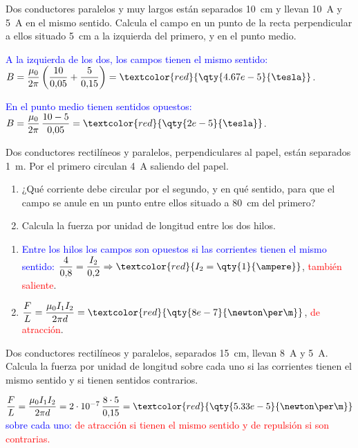 \begin{exercise}
    Dos conductores paralelos y muy largos están separados \qty{10}{\cm} y llevan \qty{10}{\ampere} y \qty{5}{\ampere} en el mismo sentido.
    Calcula el campo en un punto de la recta perpendicular a ellos situado \qty{5}{\cm} a la izquierda del primero, y en el punto medio.
    \begin{solu}
        \textcolor{blue}{A la izquierda de los dos, los campos tienen el mismo sentido:}
        \(B = \dfrac{\mu_0}{2\pi}\left(\dfrac{10}{0{,}05} + \dfrac{5}{0{,}15}\right) = \textcolor{red}{\qty{4.67e-5}{\tesla}}\).

        \textcolor{blue}{En el punto medio tienen sentidos opuestos:} \(B = \dfrac{\mu_0}{2\pi}\,\dfrac{10 - 5}{0{,}05} = \textcolor{red}{\qty{2e-5}{\tesla}}\).
    \end{solu}
\end{exercise}

\begin{exercise}
    Dos conductores rectilíneos y paralelos, perpendiculares al papel, están separados \qty{1}{\m}. Por el primero circulan \qty{4}{\ampere}
    saliendo del papel.
    \begin{enumerate}[label=\letraminuscula]
        \item ¿Qué corriente debe circular por el segundo, y en qué sentido, para que el campo se anule en un punto entre ellos situado a
        \qty{80}{\cm} del primero?
        \item Calcula la fuerza por unidad de longitud entre los dos hilos.
    \end{enumerate}
    \begin{solu}
        \begin{enumerate}[label=\letraminuscula]
            \item \textcolor{blue}{Entre los hilos los campos son opuestos si las corrientes tienen el mismo sentido:}
            \(\dfrac{4}{0{,}8} = \dfrac{I_2}{0{,}2} \Rightarrow \textcolor{red}{I_2 = \qty{1}{\ampere}}\), \textcolor{red}{también saliente}.
            \item \(\dfrac{F}{L} = \dfrac{\mu_0 I_1 I_2}{2\pi d} = \textcolor{red}{\qty{8e-7}{\newton\per\m}}\), \textcolor{red}{de atracción}.
        \end{enumerate}
    \end{solu}
\end{exercise}

\begin{exercise}
    Dos conductores rectilíneos y paralelos, separados \qty{15}{\cm}, llevan \qty{8}{\ampere} y \qty{5}{\ampere}. Calcula la fuerza por unidad de
    longitud sobre cada uno si las corrientes tienen el mismo sentido y si tienen sentidos contrarios.
    \begin{solu}
        \(\dfrac{F}{L} = \dfrac{\mu_0 I_1 I_2}{2\pi d} = 2\cdot 10^{-7}\,\dfrac{8\cdot 5}{0{,}15} = \textcolor{red}{\qty{5.33e-5}{\newton\per\m}}\) \textcolor{blue}{sobre cada uno:}
        \textcolor{red}{de atracción si tienen el mismo sentido y de repulsión si son contrarias.}
    \end{solu}
\end{exercise}

